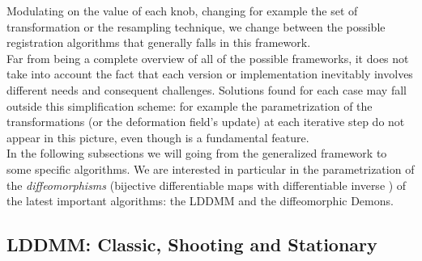 \noindent
Modulating on the value of each knob, changing for example the set of transformation or the resampling technique, we change between the possible registration algorithms that generally falls in this framework.\\

\noindent
Far from being a complete overview of all of the possible frameworks, it does not take into account the fact that each version or implementation inevitably involves different needs and consequent challenges. Solutions found for each case may fall outside this simplification scheme: for example the parametrization of the transformations (or the deformation field's update) at each iterative step do not appear in this picture, even though is a fundamental feature. \\
In the following subsections we will going from the generalized framework to some specific algorithms. We are interested in particular in the parametrization of the \emph{diffeomorphisms} (bijective differentiable maps with differentiable inverse \cite{lee2012introduction}) of the latest important algorithms: the LDDMM and the diffeomorphic Demons.

\subsection{LDDMM: Classic, Shooting and Stationary}

